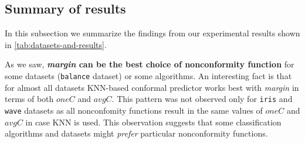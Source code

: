 
%
%

\subsection{Summary of results}
\label{sec:experiments:summary}

In this subsection we summarize the findings from our experimental results shown in \cref{tab:datasets-and-results}.

    As we saw, \textbf{\textit{margin} can be the best choice of nonconformity function} for some datasets (\verb|balance| dataset) or some algorithms. 
    An interesting fact is that for almost all datasets KNN-based conformal predictor works best with \textit{margin} in terms of both $oneC$ and $avgC$.
    This pattern was not observed only for \verb|iris| and \verb|wave| datasets as all 
    nonconfomity functions result in the same values of $oneC$ and $avgC$ in case KNN is used. This observation
    suggests that some classification algorithms and datasets might \textit{prefer} particular
    nonconformity functions.
    
